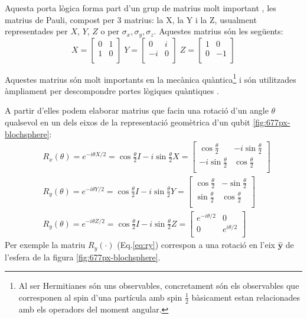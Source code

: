 Aquesta porta lògica forma part d'un grup de matrius molt important , les matrius de Pauli, compost  per 3 matrius: la X, la Y i la Z, usualment representades per $X$, $Y$, $Z$ o per $\sigma_x, \sigma_y, \sigma_z$. Aquestes matrius són les següents:
$$
	 X = \begin{bmatrix} 0 & 1\\ 1 & 0\\ \end{bmatrix} \; Y = \begin{bmatrix} 0 & i\\ -i & 0\\ \end{bmatrix} \; Z = \begin{bmatrix} 1 & 0\\ 0 & -1\\ \end{bmatrix} 
$$

Aquestes matrius són molt importants en la mecànica quàntica\footnote{Al ser Hermitianes són uns observables, concretament són els observables que corresponen al spin d'una partícula amb spin $\frac{1}{2}$ bàsicament estan relacionades amb els operadors del moment angular.} i són utilitzades àmpliament per descompondre portes lògiques quàntiques \cite{QCandQI:pauli}.

A partir d'elles podem elaborar matrius que facin una rotació d'un angle $\theta$ \cite{QCandQI:pauli} qualsevol en un dels eixos de la representació geomètrica d'un qubit \ref{fig:677px-blochsphere}:
\begin{align}
	& R_x(\theta) =  e^{-i\theta X/2} = \cos \frac{\theta}{2}I -i \sin \frac{\theta}{2}X = 
	\begin{bmatrix}
		\cos \frac{\theta}{2} & -i \sin \frac{\theta}{2} \\
		-i\sin \frac{\theta}{2} & \cos\frac{\theta}{2} \\
	\end{bmatrix} \label{eq:rx}\\
	& R_y(\theta) =  e^{-i\theta Y/2} = \cos \frac{\theta}{2}I -i \sin \frac{\theta}{2}Y = 
	\begin{bmatrix}
		\cos \frac{\theta}{2} & -\sin \frac{\theta}{2} \\
		\sin \frac{\theta}{2} & \cos\frac{\theta}{2} \\
	\end{bmatrix} \label{eq:ry}\\
	& R_y(\theta) =  e^{-i\theta Z/2} = \cos \frac{\theta}{2}I -i \sin \frac{\theta}{2}Z = 
	\begin{bmatrix}
		e^{-i\theta/2} & 0 \\
		0 & e^{i\theta/2} \\
	\end{bmatrix} \label{eq:rz}
\end{align}
Per exemple la matriu $R_y(\cdot)$ (Eq.\ref{eq:ry}) correspon a una rotació en l'eix $\hat{\mathbf{y}}$ de l'esfera de la figura \ref{fig:677px-blochsphere}.

